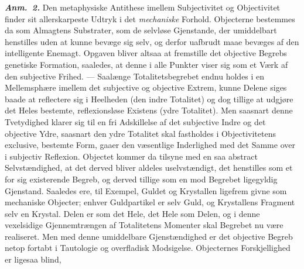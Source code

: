 \documentclass[12pt]{book}
\newcommand{\anm}[1]{\emph{\textbf{Anm.~#1.}}}
\newcommand{\opage}[1]{\marginnote{\footnotesize\textit{[#1]}}}
\begin{document}
\anm{2} Den metaphysiske Antithese imellem Subjectivitet og Objectivitet finder sit
allerskarpeste Udtryk i det \emph{mechaniske} Forhold. Objecterne bestemmes da som
Almagtens Substrater, som de selvløse Gjenstande, der umiddelbart henstilles uden at
kunne bevæge sig selv, og derfor uafbrudt maae bevæges af den intelligente Enemagt.
Opgaven bliver altsaa at fremstille det objective Begrebs genetiske Formation, saaledes,
at denne i alle Punkter viser sig som et Værk af den subjective Frihed. --- Saalænge
Totalitetsbegrebet endnu holdes i en Mellemsphære imellem det subjective og objective
Extrem, kunne Delene siges baade at reflectere sig i Heelheden (den indre Totalitet) og
dog tillige at udgjøre det Heles bestemte, reflexionsløse Existens (ydre Totalitet). Men
saasnart denne Tvetydighed klarer sig til en fri Adskillelse af det subjective Indre og
det objective Ydre, saasnart den ydre Totalitet skal fastholdes i Objectivitetens
exclusive, bestemte Form, gaaer den væsentlige Inderlighed med det Samme over i
subjectiv Reflexion. Objectet kommer da tilsyne med en saa abstract Selvstændighed, at
det derved bliver aldeles uselvstændigt, det henstilles som et for sig existerende
Begreb, og derved tillige som en mod Begrebet ligegyldig Gjenstand. Saaledes ere, til
Exempel, Guldet og Krystallen ligefrem givne som mechaniske Objecter; enhver
Guldpartikel er selv Guld, og Krystallens Fragment selv en Krystal. Delen er som det
Hele, det Hele som Delen, og i denne vexelsidige Gjennemtrængen af Totalitetens
Momenter skal Begrebet nu være realiseret. Men med denne umiddelbare Gjenstændighed er
det objective Begreb netop fortabt i Tautologie og overfladisk Modsigelse. Objecternes
Forskjellighed er ligesaa blind,
\opage{209} %
%
\end{document}
